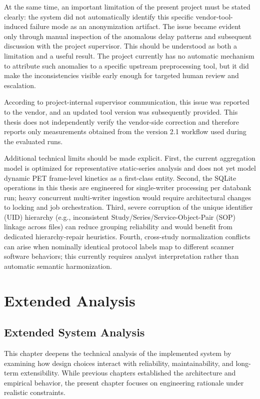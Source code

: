 At the same time, an important limitation of the present project must be stated clearly: the system did not automatically identify this specific vendor-tool-induced failure mode as an anonymization artifact. The issue became evident only through manual inspection of the anomalous delay patterns and subsequent discussion with the project supervisor. This should be understood as both a limitation and a useful result. The project currently has no automatic mechanism to attribute such anomalies to a specific upstream preprocessing tool, but it did make the inconsistencies visible early enough for targeted human review and escalation.

According to project-internal supervisor communication, this issue was reported to the vendor, and an updated tool version was subsequently provided. This thesis does not independently verify the vendor-side correction and therefore reports only measurements obtained from the version 2.1 workflow used during the evaluated runs.

Additional technical limits should be made explicit. First, the current aggregation model is optimized for representative static-series analysis and does not yet model dynamic PET frame-level kinetics as a first-class entity. Second, the SQLite operations in this thesis are engineered for single-writer processing per databank run; heavy concurrent multi-writer ingestion would require architectural changes to locking and job orchestration. Third, severe corruption of the unique identifier (UID) hierarchy (e.g., inconsistent Study/Series/Service-Object-Pair (SOP) linkage across files) can reduce grouping reliability and would benefit from dedicated hierarchy-repair heuristics. Fourth, cross-study normalization conflicts can arise when nominally identical protocol labels map to different scanner software behaviors; this currently requires analyst interpretation rather than automatic semantic harmonization.

\section{Extended Analysis}
\subsection{Extended System Analysis}
This chapter deepens the technical analysis of the implemented system by examining how design choices interact with reliability, maintainability, and long-term extensibility. While previous chapters established the architecture and empirical behavior, the present chapter focuses on engineering rationale under realistic constraints.

